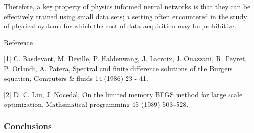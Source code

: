\documentclass{beamer}
\begin{document}
\begin{frame}

Therefore, a key property of physics informed neural networks is that they can be effectively trained using small data sets; a setting often encountered in the study of physical systems for which the cost of data acquisition may be prohibitive.
    
\end{frame}

\begin{frame}{Reference}

[1] C. Basdevant, M. Deville, P. Haldenwang, J. Lacroix, J. Ouazzani, R. Peyret, P. Orlandi, A. Patera, Spectral and finite difference solutions of the Burgers equation, Computers & fluids 14 (1986) 23 - 41.

[2] D. C. Liu, J. Nocedal, On the limited memory BFGS method for large scale optimization, Mathematical programming 45 (1989) 503–528. 

\end{frame}


\begin{frame}
    \frametitle{Conclusions}

\end{frame}




\end{document}

